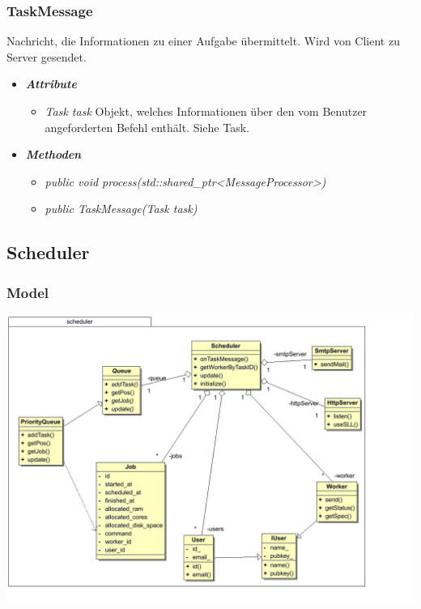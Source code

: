\documentclass[a4paper,12pt]{article}
\begin{document}
\subsubsection{TaskMessage}

Nachricht, die Informationen zu einer Aufgabe übermittelt. Wird von Client zu Server gesendet.

	\begin{itemize}[label={}]

	\item\textit{\textbf{Attribute}}
		\begin{itemize}[label={\textbullet}]
			\item\textit{Task task} Objekt, welches Informationen über den vom Benutzer angeforderten Befehl enthält. Siehe Task.
			
		\end{itemize}

	\item\textit{\textbf{Methoden}}
		\begin{itemize}[label={\textbullet}]
			\item\textit{public void process(std::shared\_ptr<MessageProcessor>)}
			\item\textit{public TaskMessage(Task task)}

		\end{itemize}
\end{itemize}
\subsection{Scheduler}

\subsubsection{Model}

\includegraphics[width=\textwidth]{scheduler}
\end{document}
